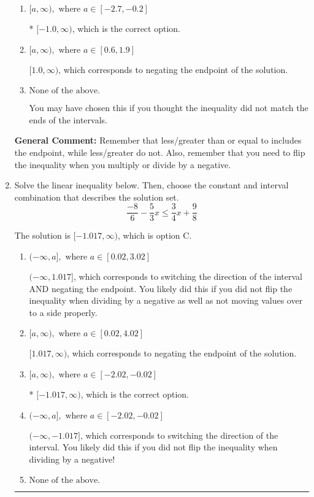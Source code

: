 \documentclass{extbook}[14pt]
\newcommand{\litem}[1]{\item #1

\rule{\textwidth}{0.4pt}}
\begin{document}
\begin{enumerate}
{\begin{enumerate}[label=\Alph*.]
 $(-\infty, -1.0]$, which corresponds to switching the direction of the interval. You likely did this if you did not flip the inequality when dividing by a negative!
\item \( [a, \infty), \text{ where } a \in [-2.7, -0.2] \)

* $[-1.0, \infty)$, which is the correct option.
\item \( [a, \infty), \text{ where } a \in [0.6, 1.9] \)

 $[1.0, \infty)$, which corresponds to negating the endpoint of the solution.
\item \( \text{None of the above}. \)

You may have chosen this if you thought the inequality did not match the ends of the intervals.
\end{enumerate}

\textbf{General Comment:} Remember that less/greater than or equal to includes the endpoint, while less/greater do not. Also, remember that you need to flip the inequality when you multiply or divide by a negative.
}
\litem{
Solve the linear inequality below. Then, choose the constant and interval combination that describes the solution set.
\[ \frac{-8}{6} - \frac{5}{3} x \leq \frac{3}{4} x + \frac{9}{8} \]

The solution is \( [-1.017, \infty) \), which is option C.\begin{enumerate}[label=\Alph*.]
\item \( (-\infty, a], \text{ where } a \in [0.02, 3.02] \)

 $(-\infty, 1.017]$, which corresponds to switching the direction of the interval AND negating the endpoint. You likely did this if you did not flip the inequality when dividing by a negative as well as not moving values over to a side properly.
\item \( [a, \infty), \text{ where } a \in [0.02, 4.02] \)

 $[1.017, \infty)$, which corresponds to negating the endpoint of the solution.
\item \( [a, \infty), \text{ where } a \in [-2.02, -0.02] \)

* $[-1.017, \infty)$, which is the correct option.
\item \( (-\infty, a], \text{ where } a \in [-2.02, -0.02] \)

 $(-\infty, -1.017]$, which corresponds to switching the direction of the interval. You likely did this if you did not flip the inequality when dividing by a negative!
\item \( \text{None of the above}. \)


\end{enumerate}}
\end{enumerate}
\end{document}
